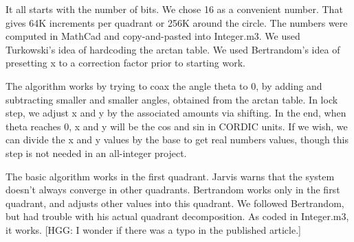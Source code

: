 It all starts with the number of bits.  We chose 16 as a convenient
number.  That gives 64K increments per quadrant or 256K around the 
circle.  The numbers were computed in MathCad and copy-and-pasted
into Integer.m3. We used Turkowski's idea of hardcoding the
arctan table.  We used Bertrandom's idea of presetting x to a correction
factor prior to starting work.

The algorithm works by trying to coax the angle theta to 0, by
adding and subtracting smaller and smaller angles, obtained from the
arctan table. In lock step, we adjust x and y by the associated amounts
via shifting.  In the end, when theta reaches 0, x and y will be the 
cos and sin in CORDIC units.  If we wish, we can divide the x and y values
by the base to get real numbers values, though this step is not
needed in an all-integer project. 

The basic algorithm works in the first quadrant.  Jarvis warns that 
the system doesn't always converge in other quadrants.  Bertrandom 
works only in the first quadrant, and adjusts other values into
this quadrant.  We followed Bertrandom, but had trouble with his actual
quadrant decomposition.  As coded in Integer.m3, it works.  [HGG:
I wonder if there was a typo in the published article.]
